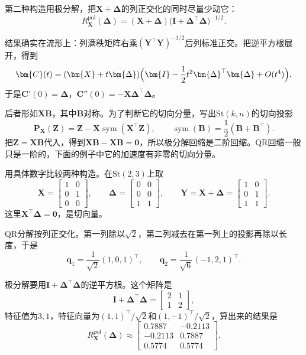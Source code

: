 第二种构造用极分解，把$\bm{X}+\bm{\Delta}$的列正交化的同时尽量少动它：
\begin{equation}
 R_{\bm{X}}^{\mathrm{pol}}(\bm{\Delta})=(\bm{X}+\bm{\Delta})\bigl(\bm{I}+\bm{\Delta}^\top\bm{\Delta}\bigr)^{-1/2}.
 \label{eq:mfo-polar-retraction}
\end{equation}

结果确实在流形上：列满秩矩阵右乘$(\bm{Y}^\top\bm{Y})^{-1/2}$后列标准正交。把逆平方根展开，得到
\[
 \bm{C}(t)=(\bm{X}+t\bm{\Delta})\Bigl(\bm{I}-\frac12t^2\bm{\Delta}^\top\bm{\Delta}+O(t^4)\Bigr).
\]
于是$\bm{C}'(0)=\bm{\Delta}$，$\bm{C}''(0)=-\bm{X}\bm{\Delta}^\top\bm{\Delta}$。

后者形如$\bm{X}\bm{B}$，其中$\bm{B}$对称。为了判断它的切向分量，写出$\mathrm{St}(k,n)$的切向投影
\begin{equation}
 \bm{P}_{\bm{X}}(\bm{Z})=\bm{Z}-\bm{X}\operatorname{sym}(\bm{X}^\top\bm{Z}),\qquad \operatorname{sym}(\bm{B})=\frac12(\bm{B}+\bm{B}^\top).
 \label{eq:mfo-stiefel-projection}
\end{equation}
把$\bm{Z}=\bm{X}\bm{B}$代入，得到$\bm{X}\bm{B}-\bm{X}\bm{B}=\bm{0}$，所以极分解回缩是二阶回缩。QR回缩一般只是一阶的，下面的例子中它的加速度有非零的切向分量。

用具体数字比较两种构造。在$\mathrm{St}(2,3)$上取
\[
 \bm{X}=\begin{bmatrix}1&0\\0&1\\0&0\end{bmatrix},\qquad
 \bm{\Delta}=\begin{bmatrix}0&0\\0&0\\1&1\end{bmatrix},\qquad
 \bm{Y}=\bm{X}+\bm{\Delta}=\begin{bmatrix}1&0\\0&1\\1&1\end{bmatrix}.
\]
这里$\bm{X}^\top\bm{\Delta}=\bm{0}$，是切向量。

QR分解按列正交化。第一列除以$\sqrt2$，第二列减去在第一列上的投影再除以长度，于是
\[
 \bm{q}_1=\frac{1}{\sqrt2}(1,0,1)^\top,\qquad
 \bm{q}_2=\frac{1}{\sqrt6}(-1,2,1)^\top.
\]

极分解要用$\bm{I}+\bm{\Delta}^\top\bm{\Delta}$的逆平方根。这个矩阵是
\[
 \bm{I}+\bm{\Delta}^\top\bm{\Delta}=\begin{bmatrix}2&1\\1&2\end{bmatrix},
\]
特征值为$3,1$，特征向量为$(1,1)^\top/\sqrt2$和$(1,-1)^\top/\sqrt2$，算出来的结果是
\[
 R_{\bm{X}}^{\mathrm{pol}}(\bm{\Delta})\approx\begin{bmatrix}0.7887&-0.2113\\-0.2113&0.7887\\0.5774&0.5774\end{bmatrix}.
\]

